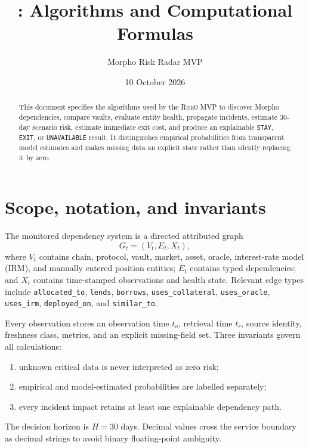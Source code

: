 \documentclass[11pt,a4paper]{article}
\title{\RiskZero{}: Algorithms and Computational Formulas}
\author{Morpho Risk Radar MVP}
\date{10 October 2026}
\newcommand{\RiskZero}{\textsc{Risk0}}
\begin{document}
\maketitle

\begin{abstract}
This document specifies the algorithms used by the \RiskZero{} MVP to discover
Morpho dependencies, compare vaults, evaluate entity health, propagate incidents,
estimate 30-day scenario risk, estimate immediate exit cost, and produce an
explainable \texttt{STAY}, \texttt{EXIT}, or \texttt{UNAVAILABLE} result.  It
distinguishes empirical probabilities from transparent model estimates and makes
missing data an explicit state rather than silently replacing it by zero.
\end{abstract}

\tableofcontents

\section{Scope, notation, and invariants}

The monitored dependency system is a directed attributed graph
\begin{equation}
G_t=(V_t,E_t,X_t),
\end{equation}
where $V_t$ contains chain, protocol, vault, market, asset, oracle, interest-rate
model (IRM), and manually entered position entities; $E_t$ contains typed
dependencies; and $X_t$ contains time-stamped observations and health state.
Relevant edge types include \texttt{allocated\_to}, \texttt{lends},
\texttt{borrows}, \texttt{uses\_collateral}, \texttt{uses\_oracle},
\texttt{uses\_irm}, \texttt{deployed\_on}, and \texttt{similar\_to}.

Every observation stores an observation time $t_o$, retrieval time $t_r$, source
identity, freshness class, metrics, and an explicit missing-field set.  Three
invariants govern all calculations:
\begin{enumerate}
  \item unknown critical data is never interpreted as zero risk;
  \item empirical and model-estimated probabilities are labelled separately;
  \item every incident impact retains at least one explainable dependency path.
\end{enumerate}

The decision horizon is $H=30$ days.  Decimal values cross the service boundary
as decimal strings to avoid binary floating-point ambiguity.
\end{document}
